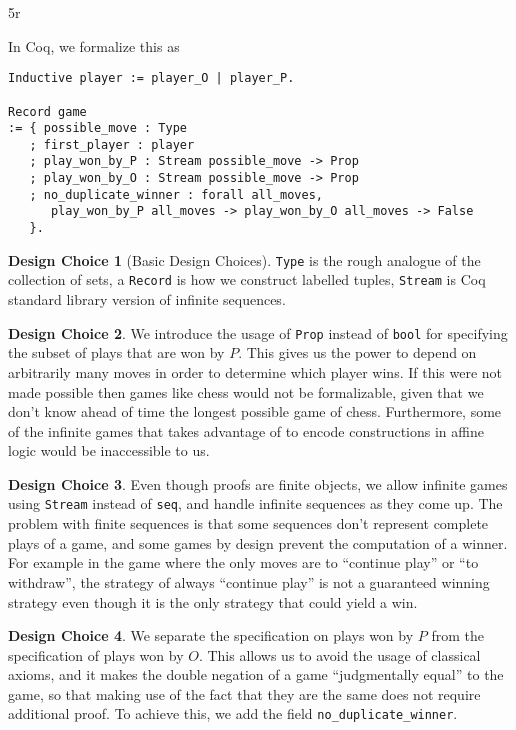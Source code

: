 5r\documentclass{article}
\theoremstyle{definition}
\newtheorem*{designchoice}{Design Choice}
\begin{document}
In Coq, we formalize this as 
\begin{verbatim}
Inductive player := player_O | player_P.

Record game
:= { possible_move : Type
   ; first_player : player
   ; play_won_by_P : Stream possible_move -> Prop
   ; play_won_by_O : Stream possible_move -> Prop
   ; no_duplicate_winner : forall all_moves,
      play_won_by_P all_moves -> play_won_by_O all_moves -> False
   }.
\end{verbatim}
\begin{designchoice}[Basic Design Choices]
\verb|Type| is the rough analogue of the collection of sets, a \verb|Record| is how we construct labelled tuples, \verb|Stream| is Coq standard library version of infinite sequences. 
\end{designchoice}
\begin{designchoice}
We introduce the usage of \verb|Prop| instead of \verb|bool| for specifying the subset of plays that are won by $P$. This gives us the power to depend on arbitrarily many moves in order to determine which player wins. If this were not made possible then games like chess would not be formalizable, given that we don't know ahead of time the longest possible game of chess. Furthermore, some of the infinite games that \textcite{Blass1992} takes advantage of to encode constructions in affine logic would be inaccessible to us. 
\end{designchoice}
\begin{designchoice}
Even though proofs are finite objects, we allow infinite games using \verb|Stream| instead of \verb|seq|, and handle infinite sequences as they come up. The problem with finite sequences is that some sequences don't represent complete plays of a game, and some games by design prevent the computation of a winner. For example in the game where the only moves are to ``continue play'' or ``to withdraw'', the strategy of always ``continue play'' is not a guaranteed winning strategy even though it is the only strategy that could yield a win. 
\end{designchoice}
\begin{designchoice}
We separate the specification on plays won by $P$ from the specification of plays won by $O$. This allows us to avoid the usage of classical axioms, and it makes the double negation of a game ``judgmentally equal'' to the game, so that making use of the fact that they are the same does not require additional proof. To achieve this, we add the field \verb|no_duplicate_winner|. 
\end{designchoice}
\end{document}
